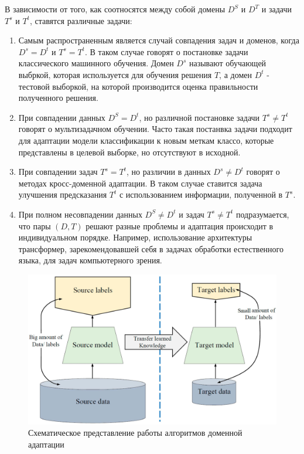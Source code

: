 В зависимости от того, как соотносятся между собой домены $D^S$ и $D^T$ и задачи $T^s$ и $T^t$, ставятся различные задачи:
\begin{enumerate}
\item Самым распространенным является случай совпадения задач и доменов, когда $D^s = D^t$ и $T^s = T^t$. В таком случае говорят о постановке задачи классического машинного обучения. Домен $D^s$ называют обучающей выбркой, которая используется для обучения решения $T$, а домен $D^t$ - тестовой выборкой, на которой производится оценка правильности полученного решения.

\item При совпадении данных $D^S = D^t$, но различной постановке задачи $T^s \ne T^t$ говорят о мультизадачном обучении. Часто такая постанвка задачи подходит для адаптации модели классификации к новым меткам классо, которые представлены в целевой выборке, но отсутствуют в исходной.

\item При совпадении задач $T^s = T^t$, но различии в данных $D^s \ne D^t$ говорят о методах кросс-доменной адаптации. В таком случае ставится задача улучшения предсказания $T^t$ с использованием информации, полученной в $T^s$. 

\item При полном несовпадении данных $D^S \ne D^t$ и задач $T^s \ne T^t$ подразумается, что пары $(D, T)$ решают разные проблемы и адаптация происходит в индивидуальном порядке. Например, использование архитектуры трансформер, зарекомендовавшей себя в задачах обработки естественного языка, для задач компьютерного зрения.
\end{enumerate} 

\begin{figure}[h]
	\centering
	\includegraphics[width=.75\textwidth]{./images/DA.jpg}
	\caption{Схематическое представление работы алгоритмов доменной адаптации}
	\label{fig:DA}
\end{figure}

